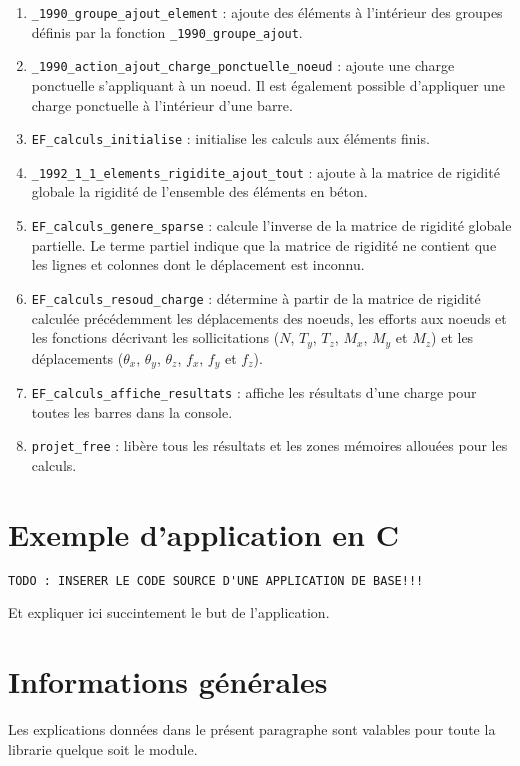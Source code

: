 \documentclass{article}
\begin{document}
\begin{enumerate}
    \item {\texttt{\_1990\_groupe\_ajout\_element}} : ajoute des éléments à l'intérieur des groupes définis par la fonction {\texttt{\_1990\_groupe\_ajout}}.
    \item {\texttt{\_1990\_action\_ajout\_charge\_ponctuelle\_noeud}} : ajoute une charge ponctuelle s'appliquant à un noeud. Il est également possible d'appliquer une charge ponctuelle à l'intérieur d'une barre.
    \item {\texttt{EF\_calculs\_initialise}} : initialise les calculs aux éléments finis.
    \item {\texttt{\_1992\_1\_1\_elements\_rigidite\_ajout\_tout}} : ajoute à la matrice de rigidité globale la rigidité de l'ensemble des éléments en béton.
    \item {\texttt{EF\_calculs\_genere\_sparse}} : calcule l'inverse de la matrice de rigidité globale partielle. Le terme partiel indique que la matrice de rigidité ne contient que les lignes et colonnes dont le déplacement est inconnu.
    \item {\texttt{EF\_calculs\_resoud\_charge}} : détermine à partir de la matrice de rigidité calculée précédemment les déplacements des noeuds, les efforts aux noeuds et les fonctions décrivant les sollicitations ($N$, $T_y$, $T_z$, $M_x$, $M_y$ et $M_z$) et les déplacements ($\theta{}_x$, $\theta{}_y$, $\theta{}_z$, $f_x$, $f_y$ et $f_z$).
    \item {\texttt{EF\_calculs\_affiche\_resultats}} : affiche les résultats d'une charge pour toutes les barres dans la console.
    \item {\texttt{projet\_free}} : libère tous les résultats et les zones mémoires allouées pour les calculs.
\end{enumerate}
\section{Exemple d'application en C}
\begin{verbatim}
TODO : INSERER LE CODE SOURCE D'UNE APPLICATION DE BASE!!!
\end{verbatim}
Et expliquer ici succintement le but de l'application.
\newpage
\section{Informations générales}
Les explications données dans le présent paragraphe sont valables pour toute la librarie quelque soit le module.
\end{document}
